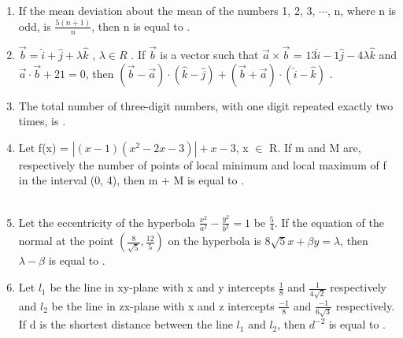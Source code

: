 \documentclass[journal]{IEEEtran}
\numberwithin{equation}{enumi}
\numberwithin{figure}{enumi}
\begin{document}
\begin{enumerate}
    \item If the mean deviation about the mean of the numbers 1, 2, 3, $\cdots$, n, where n is odd, is $\frac{5(n+1)}{n}$, then n is equal to \underline{\hspace{1cm}}.
    \bigskip
    
    \item $\overset{\rightarrow}{b} = \hat{i} + \hat{j} + \lambda\hat{k}$ , $\lambda \in R$ . If $\overset{\rightarrow}{b}$ is a vector such that $\overset{\rightarrow}{a} \times \overset{\rightarrow}{b}$ = $13\hat{i} - 1\hat{j} - 4\lambda\hat{k}$ and $\overset{\rightarrow}{a} \cdot \overset{\rightarrow}{b} + 21 = 0$, then $(\overset{\rightarrow}{b} - \overset{\rightarrow}{a}) \cdot (\hat{k} - \hat{j}) + (\overset{\rightarrow}{b} + \overset{\rightarrow}{a}) \cdot (\hat{i} - \hat{k})$ \underline{\hspace{1cm}}. 
    \bigskip
    
    \item The total number of three-digit numbers, with one digit repeated exactly two times, is \underline{\hspace{1cm}}. 
    \bigskip
    
    \item Let f(x) = $|(x - 1)(x^2 - 2x - 3)| + x - 3$, x $\in$ R. If m and M are, respectively the number of points of local minimum and local maximum of f in the interval (0, 4), then m + M is equal to \underline{\hspace{1cm}}. \\\\
    \bigskip
    
    \item Let the eccentricity of the hyperbola $\frac{x^2}{a^2} - \frac{y^2}{b^2} = 1$ be $\frac{5}{4}$. If the equation of the normal at the point $(\frac{8}{\sqrt{5}},\frac{12}{5})$ on the hyperbola is $8\sqrt{5}x + \beta y = \lambda$, then $\lambda - \beta$ is equal to \underline{\hspace{1cm}}. 
    \bigskip
    
    \item Let $l_1$ be the line in xy-plane with x and y intercepts $\frac{1}{8}$ and $\frac{1}{4\sqrt{2}}$ respectively and $l_2$ be the line in zx-plane with x and z intercepts $\frac{-1}{8}$ and $\frac{-1}{6\sqrt{3}}$ respectively. If d is the shortest distance between the line $l_1$ and $l_2$, then $d^{-2}$ is equal to \underline{\hspace{1cm}}. \\\\
\end{enumerate}
\end{document}
